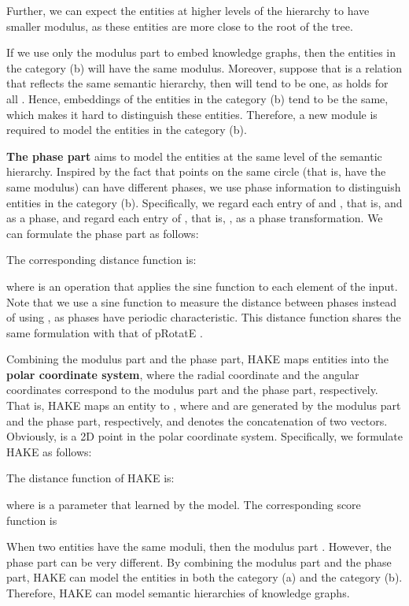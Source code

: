 \documentclass[letterpaper]{article} \usepackage{aaai20}  \usepackage{times}  \usepackage{helvet} \usepackage{courier}  \usepackage[hyphens]{url}  \usepackage{graphicx} \urlstyle{rm} \def\UrlFont{\rm}  \usepackage{graphicx}  \frenchspacing  \setlength{\pdfpagewidth}{8.5in}  \setlength{\pdfpageheight}{11in}
\newcommand{\citep}{\cite}
\begin{document}
Further, we can expect the entities at higher levels of the hierarchy to have smaller modulus, as these entities are more close to the root of the tree.

If we use only the modulus part to embed knowledge graphs, then the entities in the category (b) will have the same modulus. Moreover, suppose that  is a relation that reflects the same semantic hierarchy, then  will tend to be one, as  holds for all . Hence, embeddings of the entities in the category (b) tend to be the same, which makes it hard to distinguish these entities. Therefore, a new module is required to model the entities in the category (b). 

\textbf{The phase part} aims to model the entities at the same level of the semantic hierarchy. Inspired by the fact that points on the same circle (that is, have the same modulus) can have different phases, we use phase information to distinguish entities in the category (b). Specifically, we regard each entry of  and , that is,  and  as a phase, and regard each entry of , that is, , as a phase transformation. We can formulate the phase part as follows:

The corresponding distance function is:

where  is an operation that applies the sine function to each element of the input. Note that we use a sine function to measure the distance between phases instead of using , as phases have periodic characteristic. This distance function shares the same formulation with that of pRotatE \citep{rotate}.

Combining the modulus part and the phase part, HAKE maps entities into the \textbf{polar coordinate system}, where the radial coordinate and the angular coordinates correspond to the modulus part and the phase part, respectively. That is, HAKE maps an entity  to , where  and  are generated by the modulus part and the phase part, respectively, and  denotes the concatenation of two vectors. Obviously,  is a 2D point in the polar coordinate system. Specifically, we formulate HAKE as follows:

The distance function of HAKE is:

where  is a parameter that learned by the model.
The corresponding score function is


When two entities have the same moduli, then the modulus part . However, the phase part  can be very different. By combining the modulus part and the phase part, HAKE can model the entities in both the category (a) and the category (b). Therefore, HAKE can model semantic hierarchies of knowledge graphs.
\end{document}
